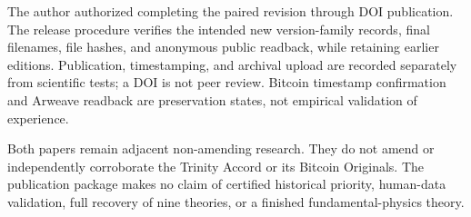 \documentclass[
  11pt,
  a4paper,
]{article}
\begin{document}
The author authorized completing the paired revision through DOI
publication. The release procedure verifies the intended new
version-family records, final filenames, file hashes, and anonymous
public readback, while retaining earlier editions. Publication,
timestamping, and archival upload are recorded separately from
scientific tests; a DOI is not peer review. Bitcoin timestamp
confirmation and Arweave readback are preservation states, not empirical
validation of experience.

Both papers remain adjacent non-amending research. They do not amend or
independently corroborate the Trinity Accord or its Bitcoin Originals.
The publication package makes no claim of certified historical priority,
human-data validation, full recovery of nine theories, or a finished
fundamental-physics theory.
\end{document}
